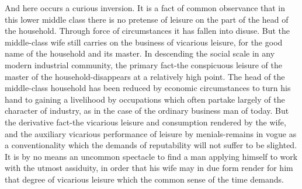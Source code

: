 \documentclass[12pt]{report}
\begin{document}
And here occurs a curious inversion. It is a fact of common observance
that in this lower middle class there is no pretense of leisure on the
part of the head of the household. Through force of circumstances it
has fallen into disuse. But the middle-class wife still carries on the
business of vicarious leisure, for the good name of the household and
its master. In descending the social scale in any modern industrial
community, the primary fact-the conspicuous leisure of the master of
the household-disappears at a relatively high point. The head of the
middle-class household has been reduced by economic circumstances to
turn his hand to gaining a livelihood by occupations which often partake
largely of the character of industry, as in the case of the ordinary
business man of today. But the derivative fact-the vicarious leisure
and consumption rendered by the wife, and the auxiliary vicarious
performance of leisure by menials-remains in vogue as a conventionality
which the demands of reputability will not suffer to be slighted. It is
by no means an uncommon spectacle to find a man applying himself to work
with the utmost assiduity, in order that his wife may in due form render
for him that degree of vicarious leisure which the common sense of the
time demands.
\end{document}

